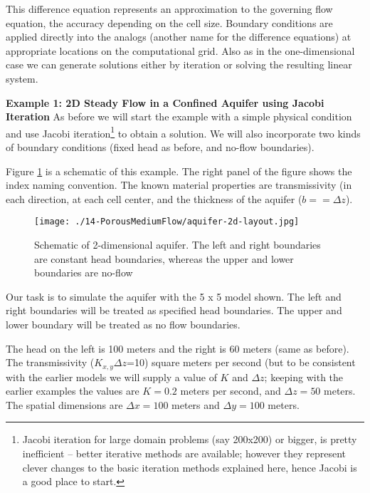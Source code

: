 This difference equation represents an approximation to the governing flow equation, the accuracy depending on the cell
size. Boundary conditions are applied directly into the analogs (another name for the difference equations) at appropriate
locations on the computational grid. Also as in the one-dimensional case we can generate solutions either by iteration or solving the resulting linear system.  

\textbf{Example 1: 2D Steady Flow in a Confined Aquifer using Jacobi Iteration}
As before we will start the example with a simple physical condition and use Jacobi iteration\footnote{Jacobi iteration for large domain problems (say 200x200) or bigger, is pretty inefficient -- better iterative methods are available; however they represent clever changes to the basic iteration methods explained here, hence Jacobi is a good place to start.} to obtain a solution.  
We will also incorporate two kinds of boundary conditions (fixed head as before, and no-flow boundaries).

Figure \ref{fig:aquifer-2d-layout} is a schematic of this example.   The right panel of the figure shows the index naming convention.  The known material properties are transmissivity (in each direction, at each cell center, and the thickness of the aquifer ($b == \Delta z$).
\begin{figure}[h!] %
   \centering
   \texttt{[image: ./14-PorousMediumFlow/aquifer-2d-layout.jpg]} 
   \caption{Schematic of 2-dimensional aquifer.  The left and right boundaries are constant head boundaries, whereas the upper and lower boundaries are no-flow}
   \label{fig:aquifer-2d-layout}
\end{figure}
Our task is to simulate the aquifer with the 5 x 5 model shown. 
The left and right boundaries will be treated as specified head boundaries. 
The upper and lower boundary will be treated as no flow boundaries.

The head on the left is 100 meters and the right is 60 meters (same as before).
The transmissivity ($K_{x,y} \Delta z$=10) square meters per second (but to be consistent with the earlier models we will supply a value of $K$ and $\Delta z$; keeping with the earlier examples the values are $K=0.2$ meters per second, and $\Delta z=50$ meters.
The spatial dimensions are $\Delta x = 100$ meters and $\Delta y = 100$ meters.

